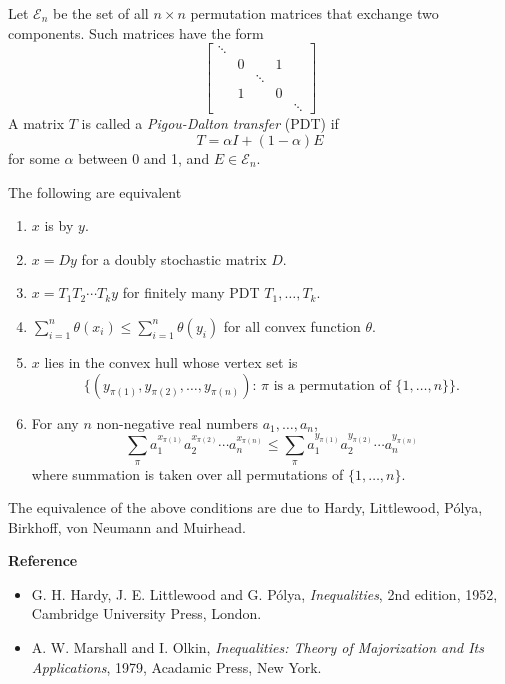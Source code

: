 \documentclass[12pt]{article}
\begin{document}
 Let $\mathcal{E}_n$ be the set of all $n\times n$ permutation
matrices that exchange two components. Such matrices have the form
\[
\begin{bmatrix}
\ddots& \\
&0 && 1 \\
&&\ddots \\
&1 && 0 \\
&&&&\ddots
\end{bmatrix}
\]
A matrix $T$ is called a {\it Pigou-Dalton transfer} (PDT) if
\[
  T = \alpha I + (1-\alpha)E
\]
for some $\alpha$ between 0 and 1, and $E\in \mathcal{E}_n$.


The following are equivalent
\begin{enumerate}
\item $x$ is  by $y$.

\item $x=Dy$ for a  doubly stochastic matrix $D$.

\item $x=T_1T_2\cdots T_k y$ for finitely many PDT $T_1,\ldots,
T_k$.

\item $\sum_{i=1}^n \theta(x_i) \leq \sum_{i=1}^n \theta(y_i)$ for
all convex function $\theta$.

\item $x$ lies in the convex hull whose vertex set is
\[
  \big\{ (y_{\pi(1)},y_{\pi(2)},\ldots, y_{\pi(n)}):\,
\pi \text{ is a permutation  of }\{1,\ldots, n\}\big\}.
\]

\item For any $n$ non-negative real numbers $a_1,\ldots, a_n$,
\[
 \sum_{\pi} a_1^{x_{\pi(1)}} a_2^{x_{\pi(2)}} \cdots
 a_n^{x_{\pi(n)}} \leq
  \sum_{\pi} a_1^{y_{\pi(1)}} a_2^{y_{\pi(2)}} \cdots
 a_n^{y_{\pi(n)}}
\]
where summation is taken over all permutations of $\{1,\ldots,
n\}$.
\end{enumerate}

The equivalence of the above conditions are due to Hardy,
Littlewood, P{\'o}lya, Birkhoff, von Neumann and Muirhead.


{\bf Reference}

\begin{itemize}
\item G. H. Hardy, J. E. Littlewood and G. P{\'o}lya, {\em
Inequalities}, 2nd edition, 1952, Cambridge University Press,
London.

\item A. W. Marshall and I. Olkin, {\em Inequalities: Theory of
Majorization and Its Applications}, 1979, Acadamic Press, New
York.
\end{itemize}
\end{document}
